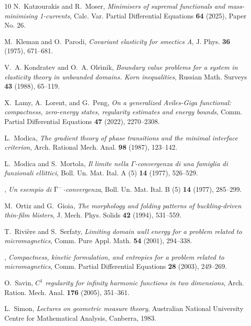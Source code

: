 \documentclass[a4paper]{article}
\theoremstyle{definition}
\theoremstyle{remark}
\begin{document}
\begin{thebibliography}{10}
N.~Katzourakis and R.~Moser, \emph{Minimisers of supremal functionals and
  mass-minimising 1-currents}, Calc. Var. Partial Differential Equations
  \textbf{64} (2025), Paper No. 26.

M.~Kleman and O.~Parodi, \emph{Covariant elasticity for smectics {A}}, J. Phys.
  \textbf{36} (1975), 671--681.

V.~A. Kondrat{\cprime}ev and O.~A. Ole{\u\i}nik, \emph{Boundary value problems
  for a system in elasticity theory in unbounded domains. {K}orn inequalities},
  Russian Math. Surveys \textbf{43} (1988), 65--119.

X.~Lamy, A.~Lorent, and G.~Peng, \emph{On a generalized {A}viles-{G}iga
  functional: compactness, zero-energy states, regularity estimates and energy
  bounds}, Comm. Partial Differential Equations \textbf{47} (2022), 2270--2308.

L.~Modica, \emph{The gradient theory of phase transitions and the minimal
  interface criterion}, Arch. Rational Mech. Anal. \textbf{98} (1987),
  123--142.

L.~Modica and S.~Mortola, \emph{Il limite nella {$\Gamma $}-convergenza di una
  famiglia di funzionali ellittici}, Boll. Un. Mat. Ital. A (5) \textbf{14}
  (1977), 526--529.

\bysame, \emph{Un esempio di {$\Gamma \sp{-}$}-convergenza}, Boll. Un. Mat.
  Ital. B (5) \textbf{14} (1977), 285--299.

M.~Ortiz and G.~Gioia, \emph{The morphology and folding patterns of
  buckling-driven thin-film blisters}, J. Mech. Phys. Solids \textbf{42}
  (1994), 531--559.

T.~Rivi{\`e}re and S.~Serfaty, \emph{Limiting domain wall energy for a problem
  related to micromagnetics}, Comm. Pure Appl. Math. \textbf{54} (2001),
  294--338.

\bysame, \emph{Compactness, kinetic formulation, and entropies for a problem
  related to micromagnetics}, Comm. Partial Differential Equations \textbf{28}
  (2003), 249--269.

O.~Savin, \emph{{$C^1$} regularity for infinity harmonic functions in two
  dimensions}, Arch. Ration. Mech. Anal. \textbf{176} (2005), 351--361.

L.~Simon, \emph{Lectures on geometric measure theory}, Australian National
  University Centre for Mathematical Analysis, Canberra, 1983.


\end{thebibliography}
\end{document}
